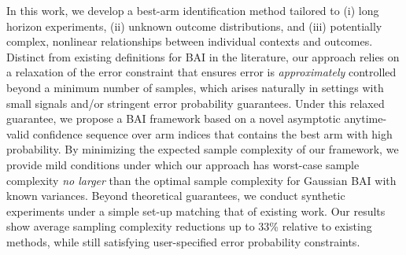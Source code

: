 \documentclass{article}
\begin{document}
In this work, we develop a best-arm identification method tailored to (i) long horizon experiments, (ii) unknown outcome distributions, and (iii) potentially complex, nonlinear relationships between individual contexts and outcomes. Distinct from existing definitions for BAI in the literature, our approach relies on a relaxation of the error constraint that ensures error is \textit{approximately} controlled beyond a minimum number of samples, which arises naturally in settings with small signals and/or stringent error probability guarantees. Under this relaxed guarantee, we propose a BAI framework based on a novel asymptotic anytime-valid confidence sequence over arm indices that contains the best arm with high probability. By minimizing the expected sample complexity of our framework, we provide mild conditions under which our approach has worst-case sample complexity \textit{no larger} than the optimal sample complexity for Gaussian BAI with known variances. Beyond theoretical guarantees, we conduct synthetic experiments under a simple set-up matching that of existing work. Our results show average sampling complexity reductions up to 33\% relative to existing methods, while still satisfying user-specified error probability constraints. 



\end{document}
